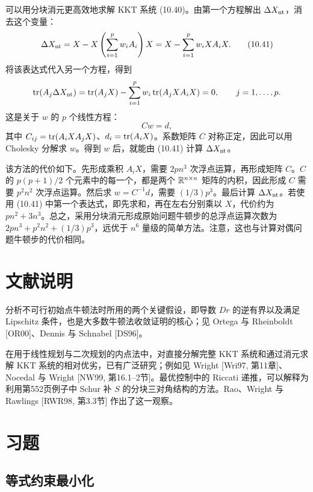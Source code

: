 可以用分块消元更高效地求解 KKT 系统 (10.40)。由第一个方程解出 $\Delta X_{\rm nt}$，消去这个变量：
\begin{equation}\Delta X_{\rm nt}=X-X\left(\sum_{i=1}^p w_iA_i\right)X=X-\sum_{i=1}^p w_iXA_iX.\tag{10.41}\end{equation}
将该表达式代入另一个方程，得到
\[\operatorname{tr}(A_j\Delta X_{\rm nt})=\operatorname{tr}(A_jX)-\sum_{i=1}^p w_i\operatorname{tr}(A_jXA_iX)=0,\qquad j=1,\ldots,p.\]
这是关于 $w$ 的 $p$ 个线性方程：
\[Cw=d,\]
其中 $C_{ij}=\operatorname{tr}(A_iXA_jX)$、$d_i=\operatorname{tr}(A_iX)$。系数矩阵 $C$ 对称正定，因此可以用 Cholesky 分解求 $w$。得到 $w$ 后，就能由 (10.41) 计算 $\Delta X_{\rm nt}$。

该方法的代价如下。先形成乘积 $A_iX$，需要 $2pn^3$ 次浮点运算，再形成矩阵 $C$。$C$ 的 $p(p+1)/2$ 个元素中的每一个，都是两个 $\mathbb R^{n\times n}$ 矩阵的内积，因此形成 $C$ 需要 $p^2n^2$ 次浮点运算。然后求 $w=C^{-1}d$，需要 $(1/3)p^3$。最后计算 $\Delta X_{\rm nt}$。若使用 (10.41) 中第一个表达式，即先求和，再在左右分别乘以 $X$，代价约为 $pn^2+3n^3$。总之，采用分块消元形成原始问题牛顿步的总浮点运算次数为 $2pn^3+p^2n^2+(1/3)p^3$，远优于 $n^6$ 量级的简单方法。注意，这也与计算对偶问题牛顿步的代价相同。

\section*{文献说明}
分析不可行初始点牛顿法时所用的两个关键假设，即导数 $Dr$ 的逆有界以及满足 Lipschitz 条件，也是大多数牛顿法收敛证明的核心；见 Ortega 与 Rheinboldt [OR00]、Dennis 与 Schnabel [DS96]。

在用于线性规划与二次规划的内点法中，对直接分解完整 KKT 系统和通过消元求解 KKT 系统的相对优劣，已有广泛研究；例如见 Wright [Wri97, 第11章]、Nocedal 与 Wright [NW99, 第16.1--2节]。最优控制中的 Riccati 递推，可以解释为利用第552页例子中 Schur 补 $S$ 的分块三对角结构的方法。Rao、Wright 与 Rawlings [RWR98, 第3.3节] 作出了这一观察。

\section*{习题}
\subsection*{等式约束最小化}

